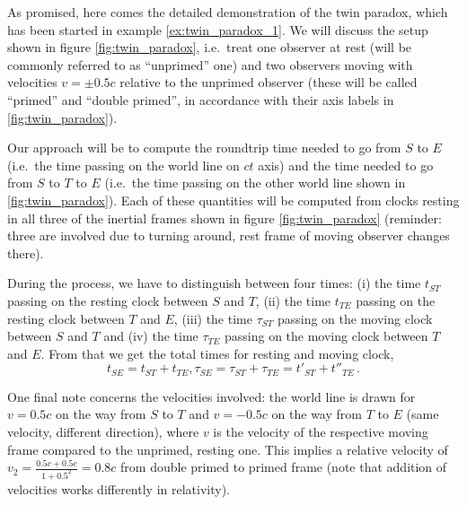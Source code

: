 \begin{ex}\label{ex:twin_paradox_2}
As promised, here comes the detailed demonstration of the twin paradox, which has been started in example \ref{ex:twin_paradox_1}. We will discuss the setup shown in figure \ref{fig:twin_paradox}, i.e.~treat one observer at rest (will be commonly referred to as \enquote{unprimed} one) and two observers moving with velocities $v = \pm 0.5 c$ relative to the unprimed observer (these will be called \enquote{primed} and \enquote{double primed}, in accordance with their axis labels in \ref{fig:twin_paradox}).

Our approach will be to compute the roundtrip time needed to go from $S$ to $E$ (i.e.~the time passing on the world line on $ct$ axis) and the time needed to go from $S$ to $T$ to $E$ (i.e.~the time passing on the other world line shown in \ref{fig:twin_paradox}). Each of these quantities will be computed from clocks resting in all three of the inertial frames shown in figure \ref{fig:twin_paradox} (reminder: three are involved due to turning around, rest frame of moving observer changes there).


During the process, we have to distinguish between four times: (i) the time $t_{ST}$ passing on the resting clock between $S$ and $T$, (ii) the time $t_{TE}$ passing on the resting clock between $T$ and $E$, (iii) the time $\tau_{ST}$ passing on the moving clock between $S$ and $T$ and (iv) the time $\tau_{TE}$ passing on the moving clock between $T$ and $E$. From that we get the total times for resting and moving clock,
\begin{equation*}
t_{SE} = t_{ST} + t_{TE}, \tau_{SE} = \tau_{ST} + \tau_{TE} = t'_{ST} + t''_{TE} \, .
\end{equation*}

One final note concerns the velocities involved: the world line is drawn for $v = 0.5 c$ on the way from $S$ to $T$ and $v = -0.5 c$ on the way from $T$ to $E$ (same velocity, different direction), where $v$ is the velocity of the respective moving frame compared to the unprimed, resting one. This implies a relative velocity of $v_2 = \frac{0.5 c + 0.5 c}{1 + 0.5^2} = 0.8 c$ from double primed to primed frame (note that addition of velocities works differently in relativity).


\end{ex}
